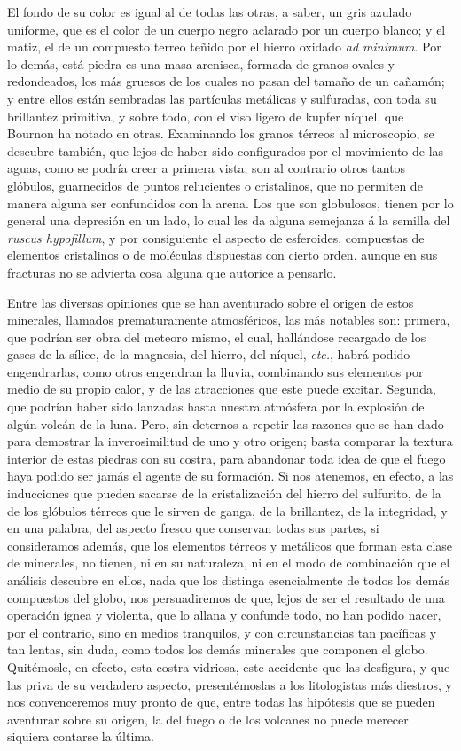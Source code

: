 \documentclass[a4paper, 12pt, oneside, spanish]{article}
\begin{document}
El fondo de su color es igual al de todas las otras, a saber, un gris azulado uniforme, que es el color de un cuerpo negro aclarado por un cuerpo blanco; y el matiz, el de un compuesto terreo teñido por el hierro oxidado \emph{ad minimum}. Por lo demás, está piedra es una masa arenisca, formada de granos ovales y redondeados, los más gruesos de los cuales no pasan del tamaño de un cañamón; y entre ellos están sembradas las partículas metálicas y sulfuradas, con toda su brillantez primitiva, y sobre todo, con el viso ligero de kupfer níquel, que Bournon ha notado en otras. Examinando los granos térreos al microscopio, se descubre también, que lejos de haber sido configurados por el movimiento de las aguas, como se podría creer a primera vista; son al contrario otros tantos glóbulos, guarnecidos de puntos relucientes o cristalinos, que no permiten de manera alguna ser confundidos con la arena. Los que son globulosos, tienen por lo general una depresión en un lado, lo cual les da alguna semejanza á la semilla del \emph{ruscus hypofillum}, y por consiguiente el aspecto de esferoides, compuestas de elementos cristalinos o de moléculas dispuestas con cierto orden, aunque en sus fracturas no se advierta cosa alguna que autorice a pensarlo.

Entre las diversas opiniones que se han aventurado sobre el origen de estos minerales, llamados prematuramente atmosféricos, las más notables son: primera, que podrían ser obra del meteoro mismo, el cual, hallándose recargado de los gases de la sílice, de la magnesia, del hierro, del níquel, \emph{etc.}, habrá podido engendrarlas, como otros engendran la lluvia, combinando sus elementos por medio de su propio calor, y de las atracciones que este puede excitar. Segunda, que podrían haber sido lanzadas hasta nuestra atmósfera por la explosión de algún volcán de la luna. Pero, sin deternos a repetir las razones que se han dado para demostrar la inverosimilitud de uno y otro origen; basta comparar la textura interior de estas piedras con su costra, para abandonar toda idea de que el fuego haya podido ser jamás el agente de su formación. Si nos atenemos, en efecto, a las inducciones que pueden sacarse de la cristalización del hierro del sulfurito, de la de los glóbulos térreos que le sirven de ganga, de la brillantez, de la integridad, y en una palabra, del aspecto fresco que conservan todas sus partes, si consideramos además, que los elementos térreos y metálicos que forman esta clase de minerales, no tienen, ni en su naturaleza, ni en el modo de combinación que el análisis descubre en ellos, nada que los distinga esencialmente de todos los demás compuestos del globo, nos persuadiremos de que, lejos de ser el resultado de una operación ígnea y violenta, que lo allana y confunde todo, no han podido nacer, por el contrario, sino en medios tranquilos, y con circunstancias tan pacíficas y tan lentas, sin duda, como todos los demás minerales que componen el globo. Quitémosle, en efecto, esta costra vidriosa, este accidente que las desfigura, y que las priva de su verdadero aspecto, presentémoslas a los litologistas más diestros, y nos convenceremos muy pronto de que, entre todas las hipótesis que se pueden aventurar sobre su origen, la del fuego o de los volcanes no puede merecer siquiera contarse la última.
\end{document}
